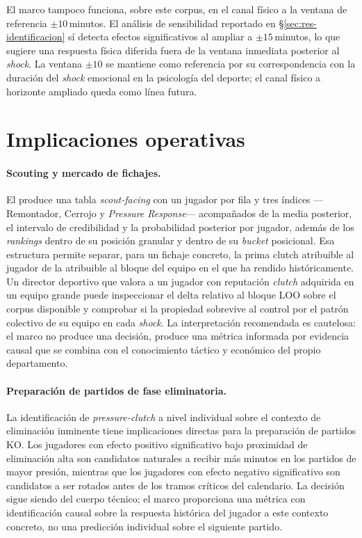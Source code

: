 El marco tampoco funciona, sobre este corpus, en el canal físico a la
ventana de referencia $\pm 10$\,minutos. El análisis de sensibilidad
reportado en §\ref{sec:res-identificacion} sí detecta efectos
significativos al ampliar a $\pm 15$\,minutos, lo que sugiere una
respuesta física diferida fuera de la ventana inmediata posterior al
\textit{shock}. La ventana $\pm 10$ se mantiene como referencia por
su correspondencia con la duración del \textit{shock} emocional en la
psicología del deporte; el canal físico a horizonte ampliado queda
como línea futura.

\section{Implicaciones operativas}
\label{sec:disc-implicaciones}

\paragraph{Scouting y mercado de fichajes.}
El \CCV produce una tabla \textit{scout-facing} con un jugador por
fila y tres índices ---Remontador, Cerrojo y \textit{Pressure
Response}--- acompañados de la media posterior, el intervalo de
credibilidad y la probabilidad posterior por jugador, además de los
\textit{rankings} dentro de su posición granular y dentro de su
\textit{bucket} posicional. Esa estructura permite separar, para un
fichaje concreto, la prima clutch atribuible al jugador de la
atribuible al bloque del equipo en el que ha rendido históricamente.
Un director deportivo que valora a un jugador con reputación
\textit{clutch} adquirida en un equipo grande puede inspeccionar el
delta relativo al bloque LOO sobre el corpus disponible y comprobar
si la propiedad sobrevive al control por el patrón colectivo de su
equipo en cada \textit{shock}. La interpretación recomendada es
cautelosa: el marco no produce una decisión, produce una métrica
informada por evidencia causal que se combina con el conocimiento
táctico y económico del propio departamento.

\paragraph{Preparación de partidos de fase eliminatoria.}
La identificación de \textit{pressure-clutch} a nivel individual
sobre el contexto de eliminación inminente tiene implicaciones
directas para la preparación de partidos KO. Los jugadores con
efecto positivo significativo bajo proximidad de eliminación alta
son candidatos naturales a recibir más minutos en los partidos de
mayor presión, mientras que los jugadores con efecto negativo
significativo son candidatos a ser rotados antes de los tramos
críticos del calendario. La decisión sigue siendo del cuerpo
técnico; el marco proporciona una métrica con identificación causal
sobre la respuesta histórica del jugador a este contexto concreto,
no una predicción individual sobre el siguiente partido.

